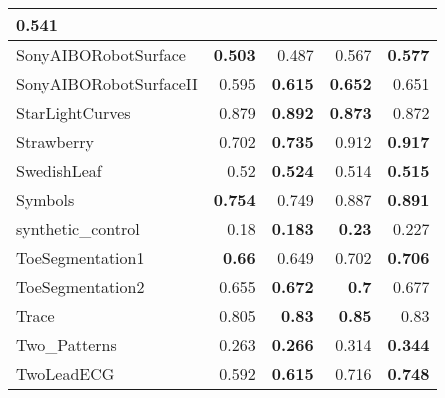 \begin{longtable}{|l||r|r||r|r|}
0.541
\bigstrut\\
\hline
SonyAIBORobotSurface &
\cellcolor[rgb]{ .973,  .796,  .678} \textbf{0.503} &
0.487 &
0.567 &
\cellcolor[rgb]{ .973,  .796,  .678} \textbf{0.577}
\bigstrut\\
\hline
\rowcolor[rgb]{ .851,  .851,  .851} SonyAIBORobotSurfaceII &
0.595 &
\cellcolor[rgb]{ .973,  .796,  .678} \textbf{0.615} &
\cellcolor[rgb]{ .973,  .796,  .678} \textbf{0.652} &
0.651
\bigstrut\\
\hline
StarLightCurves &
0.879 &
\cellcolor[rgb]{ .973,  .796,  .678} \textbf{0.892} &
\cellcolor[rgb]{ .973,  .796,  .678} \textbf{0.873} &
0.872
\bigstrut\\
\hline
\rowcolor[rgb]{ .851,  .851,  .851} Strawberry &
0.702 &
\cellcolor[rgb]{ .973,  .796,  .678} \textbf{0.735} &
0.912 &
\cellcolor[rgb]{ .973,  .796,  .678} \textbf{0.917}
\bigstrut\\
\hline
SwedishLeaf &
0.52 &
\cellcolor[rgb]{ .973,  .796,  .678} \textbf{0.524} &
0.514 &
\cellcolor[rgb]{ .973,  .796,  .678} \textbf{0.515}
\bigstrut\\
\hline
\rowcolor[rgb]{ .851,  .851,  .851} Symbols &
\cellcolor[rgb]{ .973,  .796,  .678} \textbf{0.754} &
0.749 &
0.887 &
\cellcolor[rgb]{ .973,  .796,  .678} \textbf{0.891}
\bigstrut\\
\hline
synthetic\_control &
0.18 &
\cellcolor[rgb]{ .973,  .796,  .678} \textbf{0.183} &
\cellcolor[rgb]{ .973,  .796,  .678} \textbf{0.23} &
0.227
\bigstrut\\
\hline
\rowcolor[rgb]{ .851,  .851,  .851} ToeSegmentation1 &
\cellcolor[rgb]{ .973,  .796,  .678} \textbf{0.66} &
0.649 &
0.702 &
\cellcolor[rgb]{ .973,  .796,  .678} \textbf{0.706}
\bigstrut\\
\hline
ToeSegmentation2 &
0.655 &
\cellcolor[rgb]{ .973,  .796,  .678} \textbf{0.672} &
\cellcolor[rgb]{ .973,  .796,  .678} \textbf{0.7} &
0.677
\bigstrut\\
\hline
\rowcolor[rgb]{ .851,  .851,  .851} Trace &
0.805 &
\cellcolor[rgb]{ .973,  .796,  .678} \textbf{0.83} &
\cellcolor[rgb]{ .973,  .796,  .678} \textbf{0.85} &
0.83
\bigstrut\\
\hline
Two\_Patterns &
0.263 &
\cellcolor[rgb]{ .973,  .796,  .678} \textbf{0.266} &
0.314 &
\cellcolor[rgb]{ .973,  .796,  .678} \textbf{0.344}
\bigstrut\\
\hline
\rowcolor[rgb]{ .851,  .851,  .851} TwoLeadECG &
0.592 &
\cellcolor[rgb]{ .973,  .796,  .678} \textbf{0.615} &
0.716 &
\cellcolor[rgb]{ .973,  .796,  .678} \textbf{0.748}
\bigstrut\\

\end{longtable}

